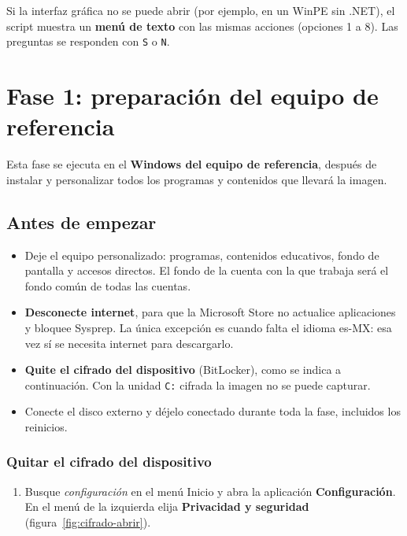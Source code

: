\documentclass[11pt,a4paper]{report}
\newcommand{\boton}[1]{\textsf{\textbf{#1}}}
\begin{document}
\begin{nota}
Si la interfaz gráfica no se puede abrir (por ejemplo, en un WinPE sin .NET),
el script muestra un \textbf{menú de texto} con las mismas acciones
(opciones 1 a 8). Las preguntas se responden con \texttt{S} o \texttt{N}.
\end{nota}

\chapter{Fase 1: preparación del equipo de referencia}

Esta fase se ejecuta en el \textbf{Windows del equipo de referencia}, después
de instalar y personalizar todos los programas y contenidos que llevará la
imagen.

\section{Antes de empezar}

\begin{itemize}
  \item Deje el equipo personalizado: programas, contenidos educativos, fondo
        de pantalla y accesos directos. El fondo de la cuenta con la que
        trabaja será el fondo común de todas las cuentas.
  \item \textbf{Desconecte internet}, para que la Microsoft Store no actualice
        aplicaciones y bloquee Sysprep. La única excepción es cuando falta el
        idioma es-MX: esa vez sí se necesita internet para descargarlo.
  \item \textbf{Quite el cifrado del dispositivo} (BitLocker), como se indica
        a continuación. Con la unidad \texttt{C:} cifrada la imagen no se puede
        capturar.
  \item Conecte el disco externo y déjelo conectado durante toda la fase,
        incluidos los reinicios.
\end{itemize}

\subsection*{Quitar el cifrado del dispositivo}\label{sec:descifrar}

\begin{enumerate}
  \item Busque \emph{configuración} en el menú Inicio y abra la aplicación
        \boton{Configuración}. En el menú de la izquierda elija
        \boton{Privacidad y seguridad} (figura~\ref{fig:cifrado-abrir}).
\end{enumerate}
\end{document}
